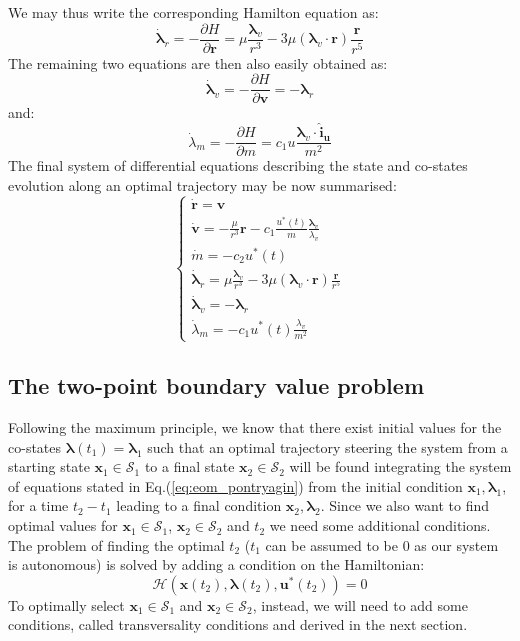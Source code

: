 \documentclass[graybox]{svmult}
\begin{document}
We may thus write the corresponding Hamilton equation as: 
$$
\dot {\boldsymbol \lambda}_r = -\frac{\partial H}{\partial \mathbf r} = \mu \frac{\boldsymbol \lambda_v}{r^3} - 3 \mu\left(\boldsymbol \lambda_v  \cdot \mathbf r\right) \frac{\mathbf r}{r^5} 
$$
The remaining two equations are then also easily obtained as:
$$
\dot {\boldsymbol \lambda}_v = -\frac{\partial H}{\partial \mathbf v} = - \boldsymbol \lambda_r 
$$
and:
$$
\dot { \lambda}_m = - \frac{\partial H}{\partial m} =  c_1 u \frac{\boldsymbol \lambda_v \cdot \mathbf{\hat i_u}}{m^2}
$$
The final system of differential equations describing the state and co-states evolution along an optimal trajectory may be now summarised:
\begin{equation}\label{eq:eom_pontryagin}
\left\{
\begin{array}{l}
    \dot {\mathbf r} = \mathbf v\\
    \dot {\mathbf v} = -\frac{\mu}{r^3}\mathbf r - c_1 \frac {u^*(t)}m \frac{\boldsymbol \lambda_v}{\lambda_v} \\
    \dot m = - c_2 u^*(t) \\
    \dot {\boldsymbol \lambda}_r = \mu \frac{\boldsymbol \lambda_v}{r^3} - 3 \mu\left(\boldsymbol \lambda_v  \cdot \mathbf r\right) \frac{\mathbf r}{r^5} \\
     \dot {\boldsymbol \lambda}_v = - \boldsymbol \lambda_r  \\
    \dot { \lambda}_m = - c_1 u^*(t) \frac{ \lambda_v }{m^2}
\end{array}
\right.
\end{equation}

\subsection {The two-point boundary value problem}
Following the maximum principle, we know that there exist initial values for the co-states $\boldsymbol \lambda(t_1) = \boldsymbol \lambda_1$ such that an optimal trajectory steering the system from a starting state $\mathbf x_1 \in \mathcal S_1$ to a final state $\mathbf x_2 \in \mathcal S_2$ will be found integrating the system of equations stated in Eq.(\ref{eq:eom_pontryagin}) from the initial condition $\mathbf x_1, \boldsymbol \lambda_1$, for a time $t_2 - t_1$ leading to a final condition $\mathbf x_2, \boldsymbol \lambda_2$. Since we also want to find optimal values for $\mathbf x_1 \in \mathcal S_1$,  $\mathbf x_2 \in \mathcal S_2$ and $t_2$ we need some additional conditions. The problem of finding the optimal $t_2$ ($t_1$ can be assumed to be 0 as our system is autonomous) is solved by adding a condition on the Hamiltonian:
\begin{equation}\label{eq:transv_time}
\mathcal H(\mathbf x(t_2), \boldsymbol \lambda(t_2), \mathbf u^*(t_2)) = 0
\end{equation}
To optimally select $\mathbf x_1 \in \mathcal S_1$ and $\mathbf x_2 \in \mathcal S_2$, instead, we will need to add some conditions, called transversality conditions and derived in the next section.
\end{document}
